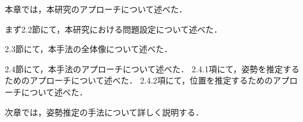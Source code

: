 本章では，本研究のアプローチについて述べた．

まず2.2節にて，本研究における問題設定について述べた．

2.3節にて，本手法の全体像について述べた．

2.4節にて，本手法のアプローチについて述べた．
2.4.1項にて，姿勢を推定するためのアプローチについて述べた．
2.4.2項にて，位置を推定するためのアプローチについて述べた．

次章では，姿勢推定の手法について詳しく説明する．


\clearpage
